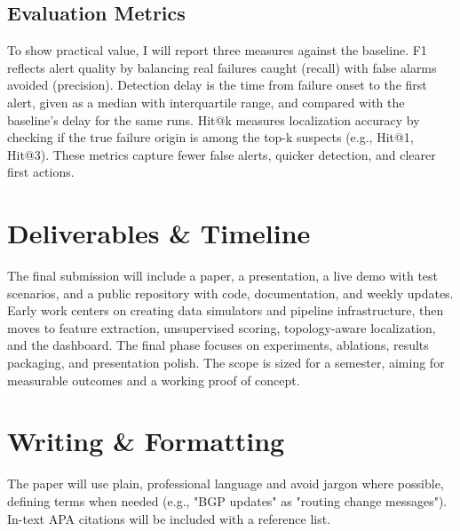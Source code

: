 \documentclass[11pt]{article}
\begin{document}
\subsection{Evaluation Metrics}

To show practical value, I will report three measures against the baseline. F1 reflects alert quality by balancing real failures caught (recall) with false alarms avoided (precision). Detection delay is the time from failure onset to the first alert, given as a median with interquartile range, and compared with the baseline's delay for the same runs. Hit@k measures localization accuracy by checking if the true failure origin is among the top-k suspects (e.g., Hit@1, Hit@3). These metrics capture fewer false alerts, quicker detection, and clearer first actions.

\section{Deliverables \& Timeline}

The final submission will include a paper, a presentation, a live demo with test scenarios, and a public repository with code, documentation, and weekly updates. Early work centers on creating data simulators and pipeline infrastructure, then moves to feature extraction, unsupervised scoring, topology-aware localization, and the dashboard. The final phase focuses on experiments, ablations, results packaging, and presentation polish. The scope is sized for a semester, aiming for measurable outcomes and a working proof of concept.

\section{Writing \& Formatting}

The paper will use plain, professional language and avoid jargon where possible, defining terms when needed (e.g., "BGP updates" as "routing change messages"). In-text APA citations will be included with a reference list.



\end{document}

